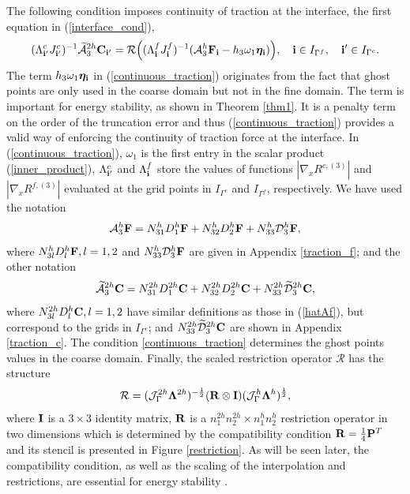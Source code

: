 The following condition imposes continuity of traction at the interface, the first equation in (\ref{interface_cond}),
\begin{equation}\label{continuous_traction}
(\Lambda^{c}_{{\bf i}'}J_{{\bf i}'}^{c})^{-1}\wt{\mathcal{A}}_3^{2h}{\bf C}_{{\bf i}'}
= {\mathcal{R}}\Big((\Lambda^f_{\bf i}{ J}^f_{\bf i})^{-1}(\mathcal{A}_3^h{\bf F}_{\bf i}-h_3\omega_1{\bm \eta}_{\bf i})\Big), \quad {\bf i}\in I_{\Gamma^f},\quad {{\bf i}'}\in I_{\Gamma^c}.
\end{equation}
{\color{red}The term $h_3\omega_1{\bm \eta}_{\bf i}$ in (\ref{continuous_traction}) originates from the fact that ghost points are only used in the coarse domain but not in the fine domain. The term is important for energy stability, as shown in Theorem \ref{thm1}. It is a penalty term on the order of the truncation error and thus (\ref{continuous_traction})  provides a valid way of enforcing the continuity of traction force at the interface.  In (\ref{continuous_traction})}, $\omega_1$ is the first entry in the scalar product (\ref{inner_product}), $\Lambda_{{\bf i}'}^c$ and $\Lambda_{\bf i}^f$ store the values of functions $|\nabla_x R^{c,(3)}|$ and $|\nabla_x R^{f,(3)}|$ evaluated at the grid points in $I_{\Gamma^c}$ and $I_{\Gamma^f}$, respectively. We have used the notation
\begin{equation}\label{hatAf}
\mathcal{A}_3^h{\bf F} = {N}_{31}^{h}{D}^h_1{\bf F} + {N}_{32}^h{D}^h_2{\bf F} + {N}_{33}^h\mathcal{D}_3^h{\bf F},
\end{equation}
where ${N}_{3l}^hD_l^h{\bf F}, l = 1,2$ and ${N}_{33}^h\mathcal{D}_3^h{\bf F}$ are given in Appendix \ref{traction_f}; and the other notation 
\begin{equation}\label{hatAc}
\wt{\mathcal{A}}_3^{2h}{\bf C} = {N}_{31}^{2h}{D}^{2h}_1{\bf C} + {N}_{32}^{2h}{D}^{2h}_2{\bf C} + {N}_{33}^{2h}\wt{\mathcal{D}}^{2h}_3{\bf C},
\end{equation}
where ${N}_{3l}^{2h}D_l^h{\bf C}, l = 1,2$ have similar definitions as those in (\ref{hatAf}), but correspond to the grids in $I_{\Gamma^c}$; and ${N}_{33}^{2h}\widetilde{\mathcal{D}}^{2h}_3{\bf C}$ are shown in Appendix \ref{traction_c}. The condition \eqref{continuous_traction} determines the ghost points values in the coarse domain. Finally, the scaled restriction operator ${\mathcal{R}} $ has the structure 
 \[{\mathcal{R}} =  (\mathcal{J}^{2h}_\Gamma \bm{\Lambda}^{2h})^{-\frac{1}{2}}({\bf R}\otimes{\bf I})(\mathcal{J}^{h}_\Gamma \bm{\Lambda}^h)^{\frac{1}{2}},\]
 where ${\bf I}$ is a $3\times3$ identity matrix, ${\bf R}$ is a $n_1^{2h}n_2^{2h}\times n_1^hn_2^h$ restriction operator in two dimensions which is determined by the compatibility condition ${\bf R}=\frac{1}{4}{\bf P}^T$ and its stencil is presented in Figure \ref{restriction}. As will be seen later, the compatibility condition, as well as the scaling of the interpolation and restrictions, are essential for energy stability \cite{Lundquist2018}.

